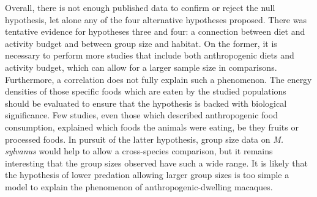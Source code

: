 \documentclass[american]{../../../coursework}
\begin{document}
Overall, there is not enough published data to confirm or reject the null
hypothesis, let alone any of the four alternative hypotheses proposed. There
was tentative evidence for hypotheses three and four: a connection between
diet and activity budget and between group size and habitat. On the former, it
is necessary to perform more studies that include both anthropogenic diets and
activity budget, which can allow for a larger sample size in comparisons.
Furthermore, a correlation does not fully explain such a phenomenon. The
energy densities of those specific foods which are eaten by the studied
populations should be evaluated to ensure that the hypothesis is backed with
biological significance. Few studies, even those which described anthropogenic
food consumption, explained which foods the animals were eating, be they
fruits or processed foods. In pursuit of the latter hypothesis, group size
data on \textit{M. sylvanus} would help to allow a cross-species comparison,
but it remains interesting that the group sizes observed have such a wide
range. It is likely that the hypothesis of lower predation allowing larger
group sizes is too simple a model to explain the phenomenon of
anthropogenic-dwelling macaques.

\printbibliography
\end{document}
